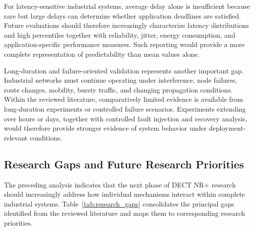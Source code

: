 For latency-sensitive industrial systems, average delay alone is insufficient because rare but large delays can determine whether application deadlines are satisfied. Future evaluations should therefore increasingly characterize latency distributions and high percentiles together with reliability, jitter, energy consumption, and application-specific performance measures. Such reporting would provide a more complete representation of predictability than mean values alone.

Long-duration and failure-oriented validation represents another important gap. Industrial networks must continue operating under interference, node failures, route changes, mobility, bursty traffic, and changing propagation conditions. Within the reviewed literature, comparatively limited evidence is available from long-duration experiments or controlled failure scenarios. Experiments extending over hours or days, together with controlled fault injection and recovery analysis, would therefore provide stronger evidence of system behavior under deployment-relevant conditions.


\subsection{Research Gaps and Future Research Priorities}
\label{subsec:future_directions}

The preceding analysis indicates that the next phase of DECT NR+ research should increasingly address how individual mechanisms interact within complete industrial systems. Table~\ref{tab:research_gaps} consolidates the principal gaps identified from the reviewed literature and maps them to corresponding research priorities.

